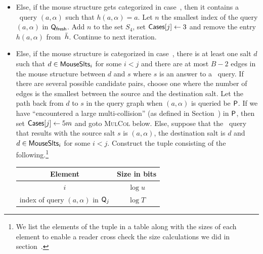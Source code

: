 \begin{enumerate}
\begin{enumerate}
\begin{itemize}
  \item Else, if the mouse structure gets categorized  in case~, then it contains a \urep\ query $(a,\alpha)$ such that $h(a,\alpha)=a$. Let $n$ the smallest index of the query $(a,\alpha)$ in $\mathsf{Q}_\textsf{fresh}$. Add $n$ to the set $S_4$, set $\mathsf{Cases}[j]\gets 3$ and remove the entry $h(a,\alpha)$ from~$\tilde{h}$. Continue to next iteration.
  \item Else, if the mouse structure is categorized in case~, there is at least one salt $d$ such that $d\in \mathsf{MouseSlts}_i$ for some $i<j$ and there are at most $B-2$ edges in the mouse structure between $d$ and $s$ where $s$ is an answer to a \new\ query. If there are several possible candidate pairs, choose one where the number of edges is the smallest between the source and the destination salt. Let the path back from $d$ to $s$ in the query graph when $(a,\alpha)$ is queried be $\mathsf{P}$.
  If we have ``encountered a large multi-collision'' (as defined in Section~) in $\mathsf{P}$, then set $\mathsf{Cases}[j]\gets 5m$ and goto \textsc{MulCol} below. Else, suppose that the \new\ query that results with the source salt $s$ is $(a,\alpha)$, the destination salt is $d$ and  $d\in \mathsf{MouseSlts}_i$ for some $i<j$.   
  Construct the tuple consisting of the following.\footnote{We list the elements of the tuple in a table along with the sizes of each element to enable a reader cross check the size calculations we did in section~.}

        \begin{center}
        \begin{tabular}{|c|c|}\hline

        Element & Size in bits \\ \hline\hline

		    $i$ & $\log u$\\ \hline
		
		    index of query $(a,\alpha)$ in $\mathsf{Q}_j$ & $\log T$   \\\hline
		    

\end{tabular}
\end{center}
\end{itemize}
\end{enumerate}
\end{enumerate}
